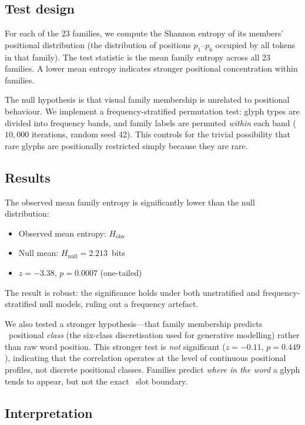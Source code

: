 \subsection{Test design}

For each of the 23 families, we compute the Shannon entropy of its
members' positional distribution (the distribution of positions
$p_1$--$p_6$ occupied by all tokens in that family). The test statistic
is the mean family entropy across all 23 families. A lower mean entropy
indicates stronger positional concentration within families.

The null hypothesis is that visual family membership is unrelated to
positional behaviour. We implement a frequency-stratified permutation
test: glyph types are divided into frequency bands, and family labels
are permuted \emph{within} each band ($10{,}000$ iterations, random
seed 42). This controls for the trivial possibility that rare glyphs
are positionally restricted simply because they are rare.

\subsection{Results}

The observed mean family entropy is significantly lower than the
null distribution:

\begin{itemize}[nosep]
  \item Observed mean entropy: $H_{\text{obs}}$
  \item Null mean: $H_{\text{null}} = 2.213$~bits
  \item $z = -3.38$, $p = 0.0007$ (one-tailed)
\end{itemize}

The result is robust: the significance holds under both unstratified
and frequency-stratified null models, ruling out a frequency artefact.

We also tested a stronger hypothesis---that family membership predicts
\silpart\ positional \emph{class} (the six-class discretisation used
for generative modelling) rather than raw word position. This stronger
test is \emph{not} significant ($z = -0.11$, $p = 0.449$), indicating
that the correlation operates at the level of continuous positional
profiles, not discrete positional classes. Families predict
\emph{where in the word} a glyph tends to appear, but not the exact
\silpart\ slot boundary.

\subsection{Interpretation}

